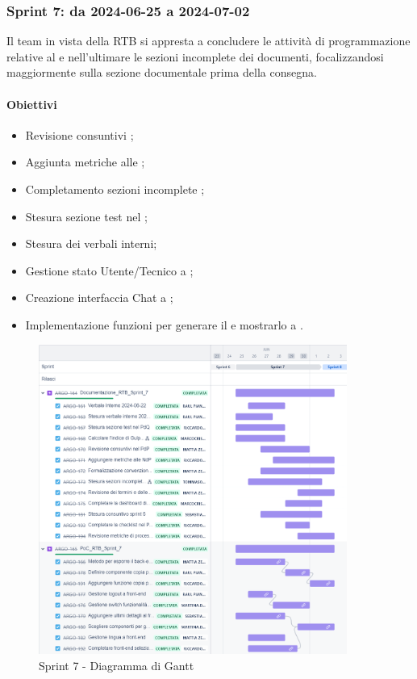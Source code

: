 \subsubsection{Sprint 7: da 2024-06-25 a 2024-07-02}
Il team in vista della RTB si appresta a concludere le attività di programmazione relative al  e nell'ultimare le sezioni incomplete dei documenti, focalizzandosi maggiormente sulla sezione documentale prima della consegna.


\paragraph{Obiettivi}
\begin{itemize}
  \item Revisione consuntivi \PdP;
  \item Aggiunta metriche alle \NdP;
  \item Completamento sezioni incomplete \NdP;
  \item Stesura sezione test nel \PdQ;
  \item Stesura dei verbali interni;
  \item Gestione stato Utente/Tecnico a ;
  \item Creazione interfaccia Chat a ;
  \item Implementazione funzioni per generare il  e mostrarlo a .
\end{itemize}

\begin{figure}[H]
  \centering
  \includegraphics[width=0.90\textwidth]{assets/Pianificazione/Sprint-7/gantt.png}
  \caption{Sprint 7 - Diagramma di Gantt}\label{fig:sprint-7-gantt}
\end{figure}